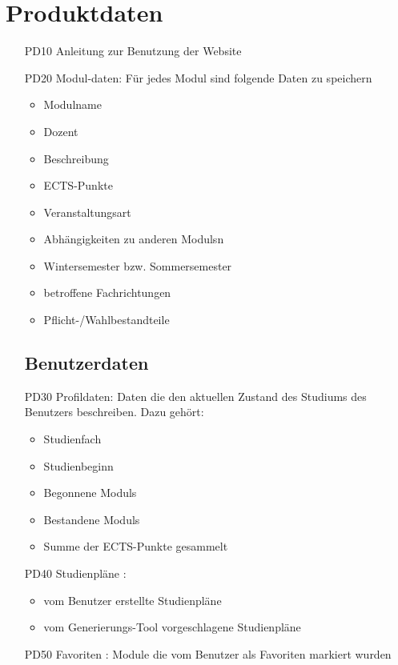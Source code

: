 \section{Produktdaten}
	\begin{itemize}[nosep]
	\subsection{Systemdaten}
	\item[PD10]Anleitung zur Benutzung der 		Website
	\item[PD20] \gls{Modul}-daten: Für jedes \gls{Modul} sind folgende Daten zu speichern	
	\begin{itemize}
	\item Modulname
	\item Dozent
	\item Beschreibung
	\item \gls{ECTS-Punkte}
	\item Veranstaltungsart
	\item Abhängigkeiten zu anderen \glspl{Modul}n
	\item Wintersemester bzw. Sommersemester
	\item betroffene Fachrichtungen 
	\item Pflicht-/Wahlbestandteile
	\end{itemize}	 
	\subsection{Benutzerdaten}
	\item[PD30]Profildaten: Daten die den aktuellen Zustand des Studiums des Benutzers beschreiben. Dazu gehört: 
		\begin{itemize}
		\item Studienfach
		\item Studienbeginn
		\item Begonnene \glspl{Modul}
		\item Bestandene \glspl{Modul} 
		\item Summe der \gls{ECTS-Punkte} gesammelt
		\end{itemize}
\item[PD40]Studienpläne :
\begin{itemize}
\item 	vom Benutzer erstellte Studienpläne 
\item	vom \gls{Generierungs-Tool} vorgeschlagene Studienpläne 
\end{itemize} 
\item[PD50] Favoriten : Module die vom Benutzer als Favoriten markiert wurden
\end{itemize}